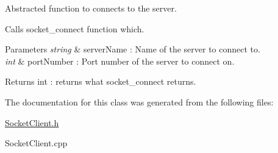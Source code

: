 Abstracted function to connects to the server. 

Calls \textquotesingle{}socket\+\_\+connect\textquotesingle{} function which. 
\begin{DoxyParams}{Parameters}
{\em \textquotesingle{}string} & server\+Name \textquotesingle{} \+: Name of the server to connect to. \\
\hline
{\em \textquotesingle{}int} & port\+Number\textquotesingle{} \+: Port number of the server to connect on. \\
\hline
\end{DoxyParams}
\begin{DoxyReturn}{Returns}
\textquotesingle{}int\textquotesingle{} \+: returns what socket\+\_\+connect returns. 
\end{DoxyReturn}


The documentation for this class was generated from the following files\+:\begin{DoxyCompactItemize}
\item 
\hyperlink{SocketClient_8h}{Socket\+Client.\+h}\item 
Socket\+Client.\+cpp\end{DoxyCompactItemize}
